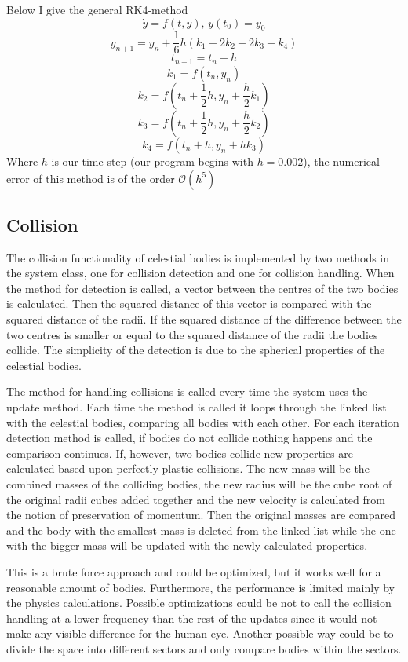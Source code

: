 \documentclass[a4paper,12pt]{article} \usepackage{graphicx}
\begin{document}
Below I give the general RK4-method
\[
\dot{y}=f(t,y),\,y(t_0)=y_0
\]
\[
y_{n+1} = y_n + \frac{1}{6}h\left( k_1 + 2k_2 + 2k_3 + k_4\right)
\]
\[
t_{n+1} = t_n +h
\]
\[
k_1 = f(t_n,y_n)
\]
\[
k_2 = f(t_n + \frac{1}{2}h,y_n + \frac{h}{2}k_1)
\]
\[
k_3 = f(t_n + \frac{1}{2}h,y_n + \frac{h}{2}k_2)
\]
\[
k_4 = f(t_n + h,y_n + hk_3)
\]
Where $h$ is our time-step (our program begins with $h = 0.002$), the numerical
error of this method is of the order $\mathcal{O}(h^5)$

\subsection{Collision}
The collision functionality of celestial bodies is implemented by two methods
in the system class, one for collision detection and one for collision
handling. When the method for detection is called, a vector
between the centres of the two bodies is calculated. Then the squared distance
of this vector is compared with the squared distance of the radii. If the
squared distance of the difference between the two centres is smaller or equal
to the squared distance of the radii the bodies collide.
The simplicity of the detection is due to the spherical properties of the
celestial bodies.

The method for handling collisions is called
every time the system uses the update method. Each time the method is called it
loops through the linked list with the celestial bodies, comparing all bodies
with each other. For each iteration detection method is called, if bodies
do not collide nothing happens and the comparison continues. If, however, two
bodies collide new properties are calculated based upon perfectly-plastic
collisions. The new mass will be the combined masses of the colliding bodies,
the new radius will be the cube root of the original radii cubes added together
and the new velocity is calculated from the notion of preservation of momentum.
Then the original masses are compared and the body with the smallest mass is
deleted from the linked list while the one with the bigger mass will be updated
with the newly calculated properties.

This is a brute force approach and could be optimized, but it works well for a
reasonable amount of bodies. Furthermore, the performance is limited mainly by
the physics calculations. Possible optimizations could be not to call the
collision handling at a lower frequency than the rest of the updates since it
would not make any visible difference for the human eye. Another possible way
could be to divide the space into different sectors and only compare bodies
within the sectors. 
\end{document}
